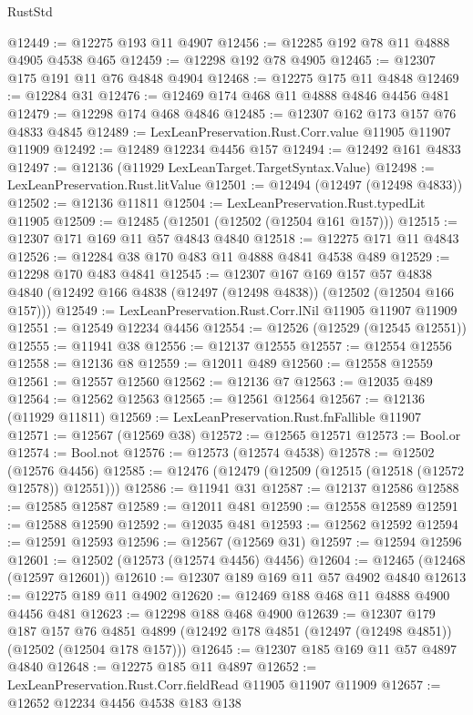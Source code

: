 \begin{lexlean}{RustStd}
\begin{coremodule}
@12449 := @12275 @193 @11 @4907
@12456 := @12285 @192 @78 @11 @4888 @4905 @4538 @465
@12459 := @12298 @192 @78 @4905
@12465 := @12307 @175 @191 @11 @76 @4848 @4904
@12468 := @12275 @175 @11 @4848
@12469 := @12284 @31
@12476 := @12469 @174 @468 @11 @4888 @4846 @4456 @481
@12479 := @12298 @174 @468 @4846
@12485 := @12307 @162 @173 @157 @76 @4833 @4845
@12489 := LexLeanPreservation.Rust.Corr.value @11905 @11907 @11909
@12492 := @12489 @12234 @4456 @157
@12494 := @12492 @161 @4833
@12497 := @12136 (@11929 LexLeanTarget.TargetSyntax.Value)
@12498 := LexLeanPreservation.Rust.litValue
@12501 := @12494 (@12497 (@12498 @4833))
@12502 := @12136 @11811
@12504 := LexLeanPreservation.Rust.typedLit @11905
@12509 := @12485 (@12501 (@12502 (@12504 @161 @157)))
@12515 := @12307 @171 @169 @11 @57 @4843 @4840
@12518 := @12275 @171 @11 @4843
@12526 := @12284 @38 @170 @483 @11 @4888 @4841 @4538 @489
@12529 := @12298 @170 @483 @4841
@12545 := @12307
    @167
    @169
    @157
    @57
    @4838
    @4840
    (@12492 @166 @4838 (@12497 (@12498 @4838)) (@12502 (@12504 @166 @157)))
@12549 := LexLeanPreservation.Rust.Corr.lNil @11905 @11907 @11909
@12551 := @12549 @12234 @4456
@12554 := @12526 (@12529 (@12545 @12551))
@12555 := @11941 @38
@12556 := @12137 @12555
@12557 := @12554 @12556
@12558 := @12136 @8
@12559 := @12011 @489
@12560 := @12558 @12559
@12561 := @12557 @12560
@12562 := @12136 @7
@12563 := @12035 @489
@12564 := @12562 @12563
@12565 := @12561 @12564
@12567 := @12136 (@11929 @11811)
@12569 := LexLeanPreservation.Rust.fnFallible @11907
@12571 := @12567 (@12569 @38)
@12572 := @12565 @12571
@12573 := Bool.or
@12574 := Bool.not
@12576 := @12573 (@12574 @4538)
@12578 := @12502 (@12576 @4456)
@12585 := @12476 (@12479 (@12509 (@12515 (@12518 (@12572 @12578)) @12551)))
@12586 := @11941 @31
@12587 := @12137 @12586
@12588 := @12585 @12587
@12589 := @12011 @481
@12590 := @12558 @12589
@12591 := @12588 @12590
@12592 := @12035 @481
@12593 := @12562 @12592
@12594 := @12591 @12593
@12596 := @12567 (@12569 @31)
@12597 := @12594 @12596
@12601 := @12502 (@12573 (@12574 @4456) @4456)
@12604 := @12465 (@12468 (@12597 @12601))
@12610 := @12307 @189 @169 @11 @57 @4902 @4840
@12613 := @12275 @189 @11 @4902
@12620 := @12469 @188 @468 @11 @4888 @4900 @4456 @481
@12623 := @12298 @188 @468 @4900
@12639 := @12307
    @179
    @187
    @157
    @76
    @4851
    @4899
    (@12492 @178 @4851 (@12497 (@12498 @4851)) (@12502 (@12504 @178 @157)))
@12645 := @12307 @185 @169 @11 @57 @4897 @4840
@12648 := @12275 @185 @11 @4897
@12652 := LexLeanPreservation.Rust.Corr.fieldRead @11905 @11907 @11909
@12657 := @12652 @12234 @4456 @4538 @183 @138

\end{coremodule}
\end{lexlean}
